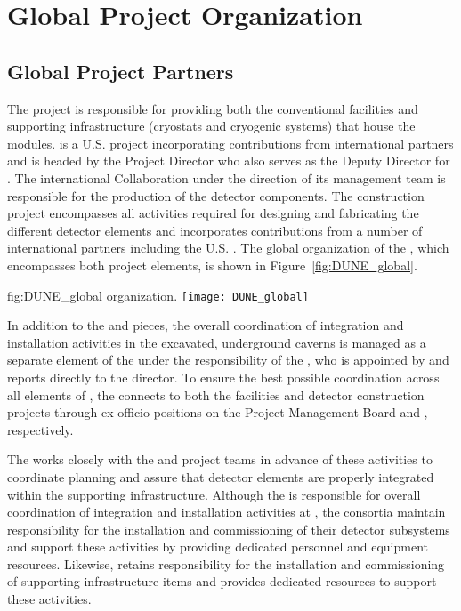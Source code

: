 \chapter{Global Project Organization}
\label{vl:tc-global}

\section{Global Project Partners}
\label{sec:partners}

The  project is responsible for providing both the
conventional facilities and supporting infrastructure (cryostats and
cryogenic systems) that house the  
modules.  is a U.S.  project incorporating
contributions from international partners and is headed by the
 Project Director who also serves as the 
Deputy Director for .  The international 
Collaboration under the direction of its management team is
responsible for the production of the detector components.  The
  construction project encompasses all
activities required for designing and fabricating the different
detector elements and incorporates contributions from a number of
international partners including the U.S. .  The global
organization of the , which encompasses both project
elements, is shown in Figure~\ref{fig:DUNE_global}.
\begin{dunefigure}{fig:DUNE_global}
  { organization.}
  \texttt{[image: DUNE\_global]}
\end{dunefigure}

In addition to the  and  pieces, the 
overall coordination of integration and installation activities 
in the excavated, underground caverns is managed as a separate
element of the  under the responsibility of 
the , who is appointed by and reports directly to the 
 director.  To ensure the best possible coordination 
across all elements of , the  connects 
to both the facilities and detector construction projects through 
ex-officio positions on the  Project Management Board 
and  , respectively.

The  works closely with the  and 
project teams in advance of these activities to coordinate planning
and assure that detector elements are properly integrated within the 
supporting infrastructure.  Although the  is responsible 
for overall coordination of integration and installation activities
at , the  consortia maintain responsibility 
for the installation and commissioning of their detector subsystems
and support these activities by providing dedicated personnel and
equipment resources.  Likewise,  retains responsibility
for the installation and commissioning of supporting infrastructure
items and provides dedicated resources to support these activities.          



